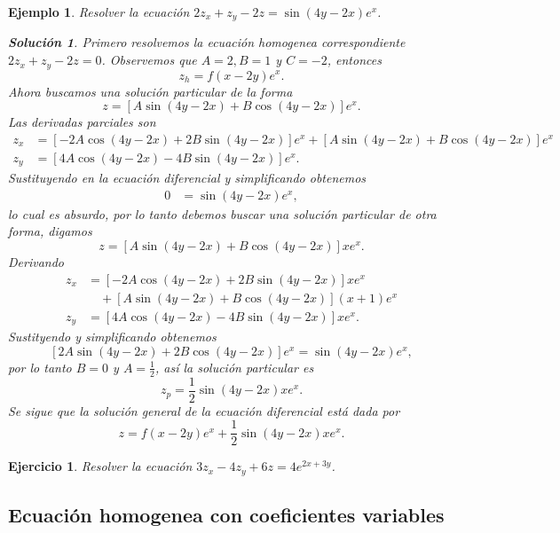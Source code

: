 \documentclass[11pt,letterpaper,draft]{report}
\newtheorem{example}[defn]{Ejemplo}
\newtheorem{exe}[defn]{Ejercicio}
\newtheorem*{sol}{Solución}
\newcommand\<{\langle}
\renewcommand\>{\rangle}
\begin{document}
\begin{example}
  Resolver la ecuación $2z_x + z_y - 2z = \sin(4y-2x)e^{x}$.

  \begin{sol}
    Primero resolvemos la ecuación homogenea correspondiente
    $2z_x + z_y - 2z = 0$. Observemos que $A = 2, B = 1$ y
    $C = -2$, entonces
     \[
      z_h = f(x-2y)e^{x}
    .\] 
    Ahora buscamos una solución particular de la forma
    \[
      z = [A \sin(4y-2x) + B \cos(4y-2x)]e^{x}
    .\] Las derivadas parciales son
    \begin{align*}
      z_x &= [-2A\cos(4y-2x) + 2B\sin(4y-2x)]e^{x} +
      [A\sin(4y-2x) + B\cos(4y-2x)]e^{x}\\
      z_y &= [4A\cos(4y-2x) - 4B\sin(4y-2x)]e^{x}.
    \end{align*}
    Sustituyendo en la ecuación diferencial y simplificando
    obtenemos
    \begin{align*}
      0 &= \sin(4y-2x)e^{x},
    \end{align*}
    lo cual es absurdo, por lo tanto debemos buscar una
    solución particular de otra forma, digamos
    \[
    z = [A\sin(4y-2x) + B\cos(4y-2x)]x e^{x}
    .\] Derivando
    \begin{align*}
      z_x &= [-2A\cos(4y-2x) + 2B\sin(4y-2x)]xe^{x}\\
          &\quad+ [A\sin(4y-2x)+B\cos(4y-2x)](x+1)e^{x}\\
      z_y &= [4A\cos(4y-2x) - 4B\sin(4y-2x)]xe^{x}.
    \end{align*}
    Sustityendo y simplificando obtenemos
    \[
      [2A\sin(4y-2x) + 2B\cos(4y-2x)]e^{x} = \sin(4y-2x)e^{x}
    ,\] 
    por lo tanto $B = 0$ y $A = \frac{1}{2}$, así la
    solución particular es
    \[
    z_p = \frac{1}{2}\sin(4y-2x)xe^{x}
    .\]
    Se sigue que la solución general de la ecuación
    diferencial está dada por
    \[
    z = f(x-2y)e^{x} + \frac{1}{2}\sin(4y-2x)xe^{x}
    .\] 
  \end{sol}
\end{example}

\begin{exe}
  Resolver la ecuación $3z_x - 4z_y + 6z = 4e^{2x+3y}$.
\end{exe}

\subsection{Ecuación homogenea con coeficientes variables}
\end{document}
